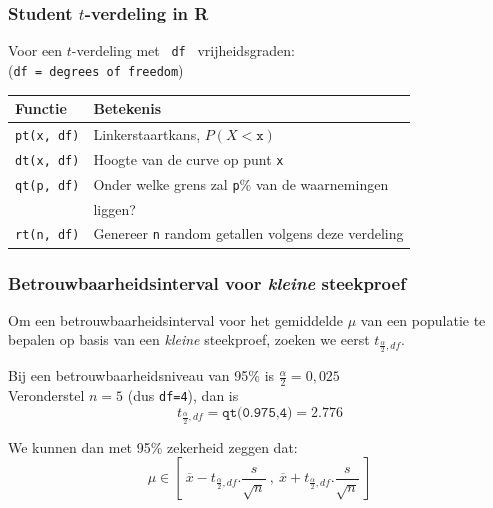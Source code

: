 \documentclass{beamer}
\begin{document}
\begin{frame}[fragile]
\frametitle{Student $t$-verdeling in R}

Voor een $t$-verdeling met ~\texttt{df}~ vrijheidsgraden:\\
\small (\texttt{df = degrees of freedom})
\vfill
\centering
\begin{tabular}{ll}
	\textbf{Functie} & \textbf{Betekenis}                                         \\ \hline
	\verb|pt(x, df)| & Linkerstaartkans, $P(X<\mathtt{x})$                        \\
	\verb|dt(x, df)| & Hoogte van de curve op punt \texttt{x}                     \\
	\verb|qt(p, df)| & Onder welke grens zal \texttt{p}\% van de waarnemingen     \\
	                 & liggen?                                                    \\
	\verb|rt(n, df)| & Genereer \texttt{n} random getallen volgens deze verdeling
\end{tabular}

\end{frame}

\begin{frame}
\frametitle{Betrouwbaarheidsinterval voor \textit{kleine} steekproef}
Om een betrouwbaarheidsinterval voor het gemiddelde $\mu$ van een populatie te bepalen op basis van een \textit{kleine} steekproef, zoeken we eerst $t_ {\frac{\alpha}{2},df}$.

\vfill
Bij een betrouwbaarheidsniveau van 95\% is $\frac{\alpha}{2}=0,025$\\
Veronderstel $n=5$ (dus \texttt{df=4}), dan is
\[ t_ {\frac{\alpha}{2},df} = \texttt{qt(0.975,4)} = 2.776 \]

\vfill
We kunnen dan met 95\% zekerheid zeggen dat:
\[ \mu \in \left[~ \overline{x} - t_{\frac{\alpha}{2},df}.\frac{s}{\sqrt{n}} ~,~ \overline{x} + t_{\frac{\alpha}{2},df}.\frac{s}{\sqrt{n}} ~\right] \]

\end{frame}
\end{document}
